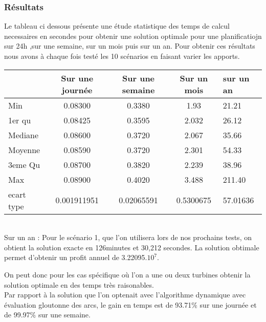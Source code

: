 \documentclass[a4paper]{report}
\begin{document}
\subsubsection{Résultats}
Le tableau ci dessous présente une étude statistique des temps de calcul necessaires en secondes pour obtenir une solution optimale pour une planificatiojn sur 24h ,sur une semaine, sur un mois puis sur un an. Pour obtenir ces résultats nous avons à chaque fois testé les 10 scénarios en faisant varier les apports.\\
\begin{tabular}{|l|c|c|c|l|}
  \hline
  &Sur une journée&Sur une semaine&Sur un mois & sur un an\\
  \hline
  Min &0.08300 &0.3380&1.93&21.21\\
  \hline
  1er qu & 0.08425 &0.3595   &2.032&26.12
\\
  \hline
  Mediane & 0.08600&0.3720  &2.067&35.66
\\
  \hline
  Moyenne &0.08590 &0.3720&2.301&54.33
\\
  \hline
  3eme Qu &0.08700 &0.3820  &2.239&38.96\\
  \hline
  Max & 0.08900   &0.4020  &3.488&211.40\\
\hline
 ecart type & 0.001911951  & 0.02065591&0.5300675 &57.01636 \\
 
  \hline
\end{tabular}
\\
Sur un an : Pour le scénario 1, que l'on utilisera lors de nos prochains tests, on obtient la solution exacte en 126minutes et 30,212 secondes. La solution obtimale permet d'obtenir un profit annuel de 3.22095.$10^7$.

On peut donc pour les cas spécifique où l'on a une ou deux turbines obtenir la solution optimale en des temps très raisonables.\\
Par rapport à la solution que l'on optenait avec l'algorithme dynamique avec évaluation gloutonne des arcs, le gain en temps est de 93.71$\%$ sur une journée et de 99.97$\%$ sur une semaine.
\end{document}
